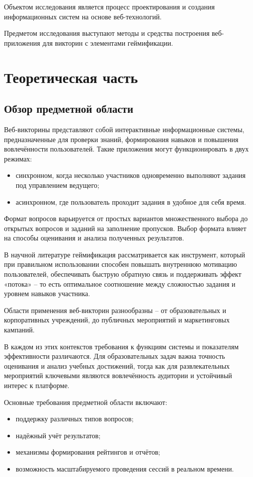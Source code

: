 \documentclass[14pt,a4paper]{extreport}
\begin{document}
Объектом исследования является процесс проектирования и создания информационных систем на основе веб-технологий.

Предметом исследования выступают методы и средства построения веб-приложения для викторин с элементами геймификации.
\newpage
\chapter[Глава \thechapter. Теоретическая часть]{Теоретическая часть}

\section{Обзор предметной области}
Веб-викторины представляют собой интерактивные информационные системы, предназначенные для проверки знаний, формирования навыков и повышения вовлечённости пользователей. Такие приложения могут функционировать в двух режимах:
\begin{itemize}
    \item синхронном, когда несколько участников одновременно выполняют задания под управлением ведущего;
    \item асинхронном, где пользователь проходит задания в удобное для себя время.
\end{itemize}

Формат вопросов варьируется от простых вариантов множественного выбора до открытых вопросов и заданий на заполнение пропусков. Выбор формата влияет на способы оценивания и анализа полученных результатов.

В научной литературе геймификация рассматривается как инструмент, который при правильном использовании способен повышать внутреннюю мотивацию пользователей, обеспечивать быструю обратную связь и поддерживать эффект «потока» -- то есть оптимальное соотношение между сложностью задания и уровнем навыков участника.

Области применения веб-викторин разнообразны -- от образовательных и корпоративных учреждений, до публичных мероприятий и маркетинговых кампаний.

В каждом из этих контекстов требования к функциям системы и показателям эффективности различаются. Для образовательных задач важна точность оценивания и анализ учебных достижений, тогда как для развлекательных мероприятий ключевыми являются вовлечённость аудитории и устойчивый интерес к платформе.

Основные требования предметной области включают:
\begin{itemize}
    \item поддержку различных типов вопросов;
    \item надёжный учёт результатов;
    \item механизмы формирования рейтингов и отчётов;
    \item возможность масштабируемого проведения сессий в реальном времени.
\end{itemize}
\end{document}
